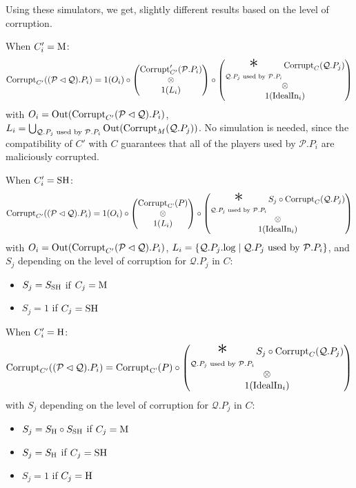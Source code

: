 \begin{theorem}
Using these simulators, we get, slightly different results based
on the level of corruption.

When $C'_i = \text{M}$:
$$
\tx{Corrupt}_{C'}((\mathcal{P} \lhd \mathcal{Q}).P_i) =
1(O_i) \circ
\begin{pmatrix}
  \tx{Corrupt}'_{C'}(\mathcal{P}.P_i)\cr
  \otimes\cr
  1(L_i)\cr
\end{pmatrix}
\circ
\begin{pmatrix}
\displaystyle \bigast_{\mathcal{Q}.P_j \tx{ used by } \mathcal{P}.P_i}
  \tx{Corrupt}_C(\mathcal{Q}.P_j)\cr
\otimes\cr
1(\tx{IdealIn}_i)
\end{pmatrix}
$$
with $O_i = \text{Out}(\text{Corrupt}_{C'}(\mathcal{P} \lhd \mathcal{Q}).P_i)$, $L_i= \bigcup_{\mathcal{Q}.P_j \text{ used by } \mathcal{P}.P_i} \text{Out}(\text{Corrupt}_M(\mathcal{Q}.P_j))$.
No simulation is needed, since the compatibility of $C'$ with $C$
guarantees that all of the players used by $\mathcal{P}.P_i$
are maliciously corrupted.

When $C'_i = \text{SH}$:
$$
\tx{Corrupt}_{C'}((\mathcal{P} \lhd \mathcal{Q}).P_i) =
1(O_i) \circ
\begin{pmatrix}
  \tx{Corrupt}_{\tx{C'}}(P)\cr
  \otimes\cr
  1(L_i)
\end{pmatrix}
\circ
\begin{pmatrix}
\displaystyle \bigast_{\mathcal{Q}.P_j \tx{ used by } \mathcal{P}.P_i}
  S_j \circ \tx{Corrupt}_C(\mathcal{Q}.P_j)\cr
  \otimes\cr
1(\tx{IdealIn}_i)
\end{pmatrix}
$$
with $O_i = \text{Out}(\text{Corrupt}_{C'}(\mathcal{P} \lhd \mathcal{Q}).P_i)$,
$L_i = \{\mathcal{Q}.P_j.\text{log} \mid \mathcal{Q}.P_j \text{ used by } \mathcal{P}.P_i \}$,
and $S_j$ depending on the level of corruption for $\mathcal{Q}.P_j$ in $C$:
\begin{itemize}
  \item $S_j = S_{\text{SH}}$ if $C_j = \text{M}$
  \item $S_j = 1$ if $C_j = \text{SH}$
\end{itemize}

When $C'_i = \text{H}$:
$$
\tx{Corrupt}_{C'}((\mathcal{P} \lhd \mathcal{Q}).P_i) =
  \tx{Corrupt}_{\tx{C'}}(P)
\circ
\begin{pmatrix}
\displaystyle \bigast_{\mathcal{Q}.P_j \tx{ used by } \mathcal{P}.P_i}
  S_j \circ \tx{Corrupt}_C(\mathcal{Q}.P_j)\cr
\otimes\cr
1(\tx{IdealIn}_i)
\end{pmatrix}
$$
with $S_j$ depending on the level of corruption for $\mathcal{Q}.P_j$ in $C$:
\begin{itemize}
  \item $S_j = S_{\text{H}} \circ S_{\text{SH}}$ if $C_j = \text{M}$
  \item $S_j = S_{\text{H}}$ if $C_j = \text{SH}$
  \item $S_j = 1$ if $C_j = \text{H}$
\end{itemize}


\end{theorem}
